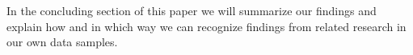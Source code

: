 In the concluding section of this paper we will summarize our findings and explain how and in which way
we can recognize findings from related research in our own data samples.
